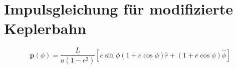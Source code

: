 \section{Impulsgleichung für modifizierte Keplerbahn}
\[
\mathbf{p}(\phi) = \frac{L}{a(1 - e^2)} \left[ e \sin \phi (1 + e \cos \phi) \hat{r} + (1 + e \cos \phi) \hat{\phi} \right]
\]